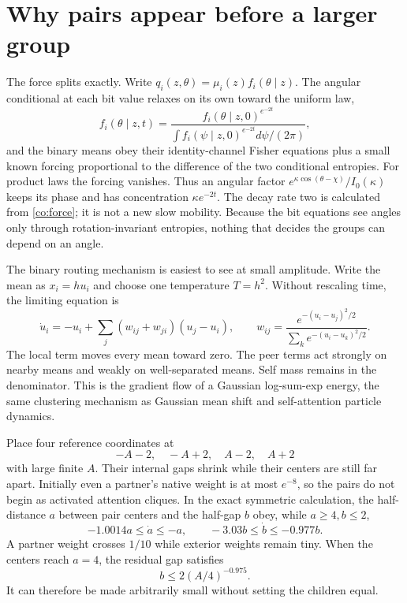 \section{Why pairs appear before a larger group}

The force splits exactly. Write $q_i(z,\theta)=\mu_i(z)f_i(\theta\mid z)$. The angular conditional at each bit value relaxes on its own toward the uniform law,
\begin{equation}
f_i(\theta\mid z,t)=
\frac{f_i(\theta\mid z,0)^{e^{-2t}}}
{\int f_i(\psi\mid z,0)^{e^{-2t}}d\psi/(2\pi)},
\label{co:angular}
\end{equation}
and the binary means obey their identity-channel Fisher equations plus a small known forcing proportional to the difference of the two conditional entropies. For product laws the forcing vanishes. Thus an angular factor $e^{\kappa\cos(\theta-\chi)}/I_0(\kappa)$ keeps its phase and has concentration $\kappa e^{-2t}$. The decay rate two is calculated from \cref{co:force}; it is not a new slow mobility. Because the bit equations see angles only through rotation-invariant entropies, nothing that decides the groups can depend on an angle.

The binary routing mechanism is easiest to see at small amplitude. Write the mean as $x_i=hu_i$ and choose one temperature $T=h^2$. Without rescaling time, the limiting equation is
\begin{equation}
\dot u_i=-u_i+\sum_j(w_{ij}+w_{ji})(u_j-u_i),
\qquad
w_{ij}=\frac{e^{-(u_i-u_j)^2/2}}{\sum_k e^{-(u_i-u_k)^2/2}}.
\label{co:limit}
\end{equation}
The local term moves every mean toward zero. The peer terms act strongly on nearby means and weakly on well-separated means. Self mass remains in the denominator. This is the gradient flow of a Gaussian log-sum-exp energy, the same clustering mechanism as Gaussian mean shift and self-attention particle dynamics.

Place four reference coordinates at
\begin{equation}
-A-2,\quad -A+2,\quad A-2,\quad A+2
\end{equation}
with large finite $A$. Their internal gaps shrink while their centers are still far apart. Initially even a partner's native weight is at most $e^{-8}$, so the pairs do not begin as activated attention cliques. In the exact symmetric calculation, the half-distance $a$ between pair centers and the half-gap $b$ obey, while $a\ge4,b\le2$,
\begin{equation}
-1.0014a\le\dot a\le-a,\qquad -3.03b\le\dot b\le-0.977b.
\end{equation}
A partner weight crosses $1/10$ while exterior weights remain tiny. When the centers reach $a=4$, the residual gap satisfies
\begin{equation}
b\le2(A/4)^{-0.975}.
\end{equation}
It can therefore be made arbitrarily small without setting the children equal.

